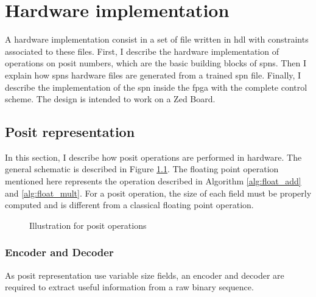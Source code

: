 
\chapter{Hardware implementation}
\label{cha:hard}

A hardware implementation consist in a set of file written in \gls{hdl} with constraints associated to these files. First, I describe the hardware implementation of operations on posit numbers, which are the basic building blocks of \glspl{spn}. Then I explain how \glspl{spn} hardware files are generated from a trained \gls{spn} file. Finally, I describe the implementation of the \gls{spn} inside the \gls{fpga} with the complete control scheme. The design is intended to work on a Zed Board.

\section{Posit representation}

In this section, I describe how posit operations are performed in hardware. The general schematic is described in Figure \ref{fig:posit_op}. The floating point operation mentioned here represents the operation described in Algorithm \ref{alg:float_add} and \ref{alg:float_mult}. For a posit operation, the size of each field must be properly computed and is different from a classical floating point operation.

\begin{figure}[!ht]
\begin{mdframed}
	\centering
	
	\caption{Illustration for posit operations}
	\label{fig:posit_op}
\end{mdframed}
\end{figure}

\subsection{Encoder and Decoder}
As posit representation use variable size fields, an encoder and decoder are required to extract useful information from a raw binary sequence.

